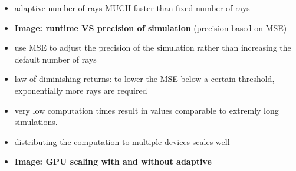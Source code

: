 \begin{itemize}

  \item adaptive number of rays MUCH faster than fixed number of rays

  \item \textbf{Image: runtime VS precision of simulation} (precision based on
    MSE)

  \item use MSE to adjust the precision of the simulation rather than
    increasing the default number of rays

  \item law of diminishing returns: to lower the MSE below a certain threshold,
    exponentially more rays are required

  \item very low computation times result in values comparable to extremly long
    simulations.

  \item distributing the computation to multiple devices scales well
  \item \textbf{Image: GPU scaling with and without adaptive}

\end{itemize}
